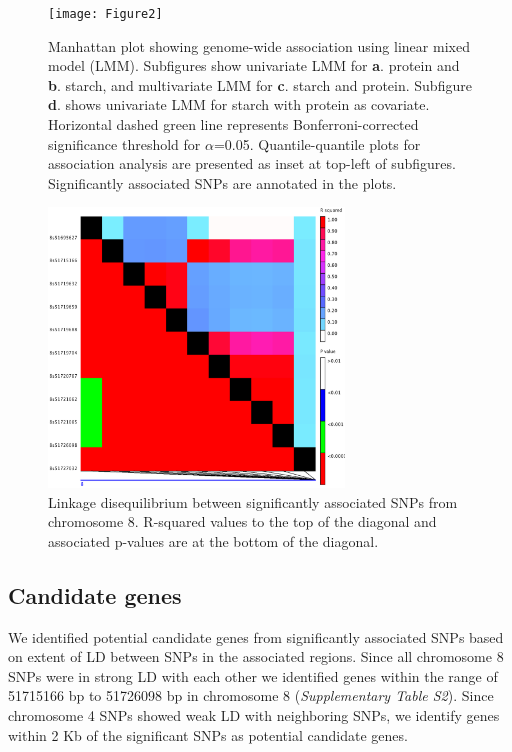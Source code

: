 \documentclass[10pt,letterpaper]{article}
\begin{document}
\begin{figure}
    \texttt{[image: Figure2]}
    \caption{Manhattan plot showing genome-wide association using linear mixed model (LMM). Subfigures show univariate LMM for \textbf{a}. protein and \textbf{ b}. starch, and multivariate LMM for \textbf{c}. starch and protein. Subfigure \textbf{d}. shows univariate LMM for starch with protein as covariate. Horizontal dashed green line represents Bonferroni-corrected significance threshold for $\alpha$=0.05. Quantile-quantile plots for association analysis are presented as inset at top-left of subfigures. Significantly associated SNPs are annotated in the plots.}
    \label{fig2}
\end{figure}

\begin{figure}
    \includegraphics[width=0.7\textwidth]{Figure3}
    \caption{Linkage disequilibrium between significantly associated SNPs from chromosome 8. R-squared values to the top of the diagonal and associated p-values are at the bottom of the diagonal.}
    \label{fig3}
\end{figure}

\subsection*{Candidate genes}
We identified potential candidate genes from significantly associated SNPs based on extent of LD between SNPs in the associated regions. Since all chromosome 8 SNPs were in strong LD with each other we identified genes within the range of 51715166 bp to 51726098 bp in chromosome 8 (\textit{Supplementary Table S2}). Since chromosome 4 SNPs showed weak LD with neighboring SNPs, we identify genes within 2 Kb of the significant SNPs as potential candidate genes.
\end{document}
